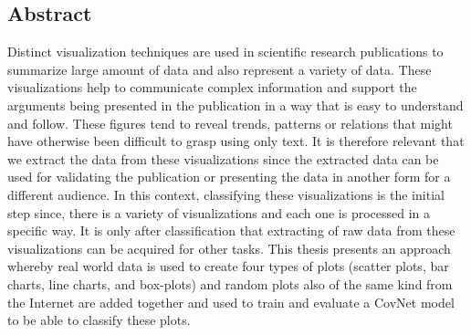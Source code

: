 \begin{titlepage}
\section{Abstract}
Distinct visualization techniques are used in scientific research publications to summarize large amount of data and also represent a variety of data. These visualizations help to communicate complex information and support the arguments being presented in the publication in a way that is easy to understand and follow.
These figures tend to reveal trends, patterns or relations that might have otherwise been difficult to grasp using only text. 
It is therefore relevant that we extract the data from these visualizations since the extracted data can be used for validating the publication or presenting the data in another form for a different audience. In this context, classifying these visualizations is the initial step since, there is a variety of visualizations and each one is processed in a specific way. It is only after classification that extracting of raw data from these visualizations can be acquired for other tasks. This thesis presents an approach whereby real world data is used to create four types of plots (scatter plots, bar charts, line charts, and box-plots) and random plots also of the same kind from the Internet are added together and used to train and evaluate a CovNet model to be able to classify these plots. 


 



\end{titlepage}